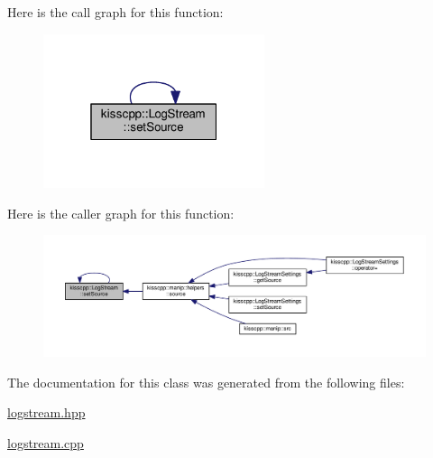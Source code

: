 Here is the call graph for this function\-:
\nopagebreak
\begin{figure}[H]
\begin{center}
\leavevmode
\includegraphics[width=184pt]{classkisscpp_1_1_log_stream_a2c96be0773180e5f0f9ba9b54a0374ae_cgraph}
\end{center}
\end{figure}




Here is the caller graph for this function\-:
\nopagebreak
\begin{figure}[H]
\begin{center}
\leavevmode
\includegraphics[width=350pt]{classkisscpp_1_1_log_stream_a2c96be0773180e5f0f9ba9b54a0374ae_icgraph}
\end{center}
\end{figure}




The documentation for this class was generated from the following files\-:\begin{DoxyCompactItemize}
\item 
\hyperlink{logstream_8hpp}{logstream.\-hpp}\item 
\hyperlink{logstream_8cpp}{logstream.\-cpp}\end{DoxyCompactItemize}

